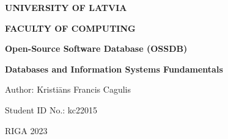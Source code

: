 \begin{titlepage}
    \thispagestyle{empty}
    \begin{center}
        \vspace*{2cm}
        \begin{large}\textbf{UNIVERSITY OF LATVIA}

            \textbf{FACULTY OF COMPUTING}

            \vfill
            \textbf{Open-Source Software Database (OSSDB)}
        \end{large}

        \vfill
        \textbf{Databases and Information Systems Fundamentals}
    \end{center}
    \vspace{4cm}
    \begin{flushright}
        Author: Kristiāns Francis Cagulis

        Student ID No.: kc22015

    \end{flushright}
    \vspace{1cm}
    \begin{center}
        RIGA 2023
    \end{center}
\end{titlepage}
